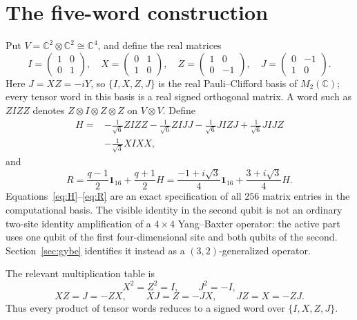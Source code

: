 \documentclass[11pt]{article}
\theoremstyle{remark}
\newcommand{\Id}{\mathbf 1}
\newcommand{\bbC}{\mathbb C}
\begin{document}
\section{The five-word construction}\label{sec:construction}

Put \(V=\bbC^2\otimes\bbC^2\cong\bbC^4\), and define the real matrices
\[
  I=\begin{pmatrix}1&0\\0&1\end{pmatrix},\quad
  X=\begin{pmatrix}0&1\\1&0\end{pmatrix},\quad
  Z=\begin{pmatrix}1&0\\0&-1\end{pmatrix},\quad
  J=\begin{pmatrix}0&-1\\1&0\end{pmatrix}.
\]
Here \(J=XZ=-iY\), so \(\{I,X,Z,J\}\) is the real Pauli--Clifford basis of
\(M_2(\bbC)\); every tensor word in this basis is a real signed orthogonal
matrix.
A word such as \(ZIZZ\) denotes
\(Z\otimes I\otimes Z\otimes Z\) on \(V\otimes V\).  Define
\begin{equation}
\begin{split}
  H={}&-\frac1{\sqrt6}ZIZZ-\frac1{\sqrt6}ZIJJ
        -\frac1{\sqrt6}JIZJ+\frac1{\sqrt6}JIJZ\\
      &-\frac1{\sqrt3}XIXX,
  \label{eq:H}
\end{split}
\end{equation}
and
\begin{equation}
  R=\frac{q-1}{2}\Id_{16}+\frac{q+1}{2}H
   =\frac{-1+i\sqrt3}{4}\Id_{16}
    +\frac{3+i\sqrt3}{4}H.
  \label{eq:R}
\end{equation}
Equations~\eqref{eq:H}--\eqref{eq:R} are an exact specification of all
\(256\) matrix entries in the computational basis.
The visible identity in the second qubit is not an ordinary two-site identity
amplification of a \(4\times4\) Yang--Baxter operator: the active part uses one
qubit of the first four-dimensional site and both qubits of the second.
Section~\ref{sec:gybe} identifies it instead as a \((3,2)\)-generalized
operator.

The relevant multiplication table is
\[
  X^2=Z^2=I,\qquad J^2=-I,
\]
\[
  XZ=J=-ZX,\qquad XJ=Z=-JX,\qquad JZ=X=-ZJ.
\]
Thus every product of tensor words reduces to a signed word over
\(\{I,X,Z,J\}\).
\end{document}

